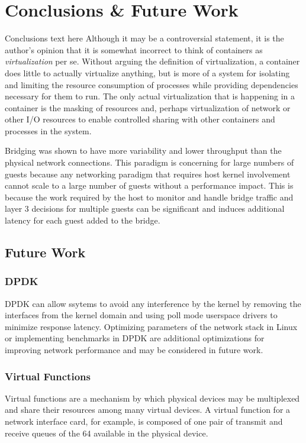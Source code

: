 \chapter{Conclusions \& Future Work}
\label{cha:conclusions}
\label{sec:conclusions}
Conclusions text here
Although it may be a controversial statement, it is the author's opinion that it is somewhat incorrect to think of containers as \emph{virtualization} per se.  
Without arguing the definition of virtualization, a container does little to actually virtualize anything, but is more of a system for isolating and limiting the resource consumption of processes while providing dependencies necessary for them to run.  
The only actual virtualization that is happening in a container is the masking of resources and, perhaps virtualization of network or other I/O resources to enable controlled sharing with other containers and processes in the system. 

Bridging was shown to have more variability and lower throughput than the physical network connections.  
This paradigm is concerning for large numbers of guests because any networking paradigm that requires host kernel involvement cannot scale to a large number of guests without a performance impact.
This is because the work required by the host to monitor and handle bridge traffic and layer 3 decisions for multiple guests can be significant and induces additional latency for each guest added to the bridge.    

\section{Future Work}
\label{sec:future_work}
\subsection{DPDK}
DPDK can allow ssytems to avoid any interference by the kernel by removing the interfaces from the kernel domain and using poll mode userspace drivers to minimize response latency.  
Optimizing parameters of the network stack in Linux or implementing benchmarks in DPDK are additional optimizations for improving network performance and may be considered in future work.

\subsection{Virtual Functions}
\label{sec:virtual_functions}
Virtual functions are a mechanism by which physical devices may be multiplexed and share their resources among many virtual devices.  
A virtual function for a network interface card, for example, is composed of one pair of transmit and receive queues of the 64 available in the physical device.

